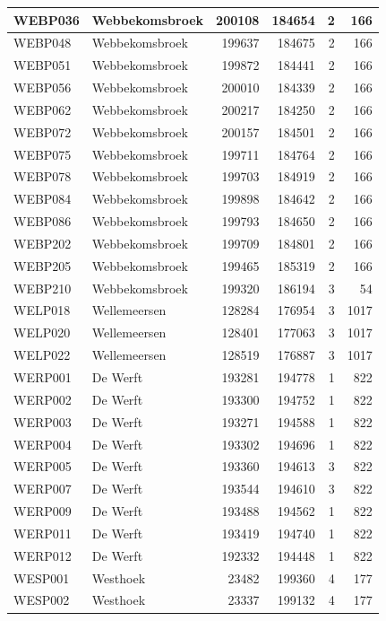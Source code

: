 \documentclass[11pt,]{book}
\begin{document}
\begin{table}
\begin{tabular}[t]{l|l|r|r|r|r}
\hline
WEBP036 & Webbekomsbroek & 200108 & 184654 & 2 & 166\\
\hline
WEBP048 & Webbekomsbroek & 199637 & 184675 & 2 & 166\\
\hline
WEBP051 & Webbekomsbroek & 199872 & 184441 & 2 & 166\\
\hline
WEBP056 & Webbekomsbroek & 200010 & 184339 & 2 & 166\\
\hline
WEBP062 & Webbekomsbroek & 200217 & 184250 & 2 & 166\\
\hline
WEBP072 & Webbekomsbroek & 200157 & 184501 & 2 & 166\\
\hline
WEBP075 & Webbekomsbroek & 199711 & 184764 & 2 & 166\\
\hline
WEBP078 & Webbekomsbroek & 199703 & 184919 & 2 & 166\\
\hline
WEBP084 & Webbekomsbroek & 199898 & 184642 & 2 & 166\\
\hline
WEBP086 & Webbekomsbroek & 199793 & 184650 & 2 & 166\\
\hline
WEBP202 & Webbekomsbroek & 199709 & 184801 & 2 & 166\\
\hline
WEBP205 & Webbekomsbroek & 199465 & 185319 & 2 & 166\\
\hline
WEBP210 & Webbekomsbroek & 199320 & 186194 & 3 & 54\\
\hline
WELP018 & Wellemeersen & 128284 & 176954 & 3 & 1017\\
\hline
WELP020 & Wellemeersen & 128401 & 177063 & 3 & 1017\\
\hline
WELP022 & Wellemeersen & 128519 & 176887 & 3 & 1017\\
\hline
WERP001 & De Werft & 193281 & 194778 & 1 & 822\\
\hline
WERP002 & De Werft & 193300 & 194752 & 1 & 822\\
\hline
WERP003 & De Werft & 193271 & 194588 & 1 & 822\\
\hline
WERP004 & De Werft & 193302 & 194696 & 1 & 822\\
\hline
WERP005 & De Werft & 193360 & 194613 & 3 & 822\\
\hline
WERP007 & De Werft & 193544 & 194610 & 3 & 822\\
\hline
WERP009 & De Werft & 193488 & 194562 & 1 & 822\\
\hline
WERP011 & De Werft & 193419 & 194740 & 1 & 822\\
\hline
WERP012 & De Werft & 192332 & 194448 & 1 & 822\\
\hline
WESP001 & Westhoek & 23482 & 199360 & 4 & 177\\
\hline
WESP002 & Westhoek & 23337 & 199132 & 4 & 177\\

\end{tabular}
\end{table}
\end{document}
